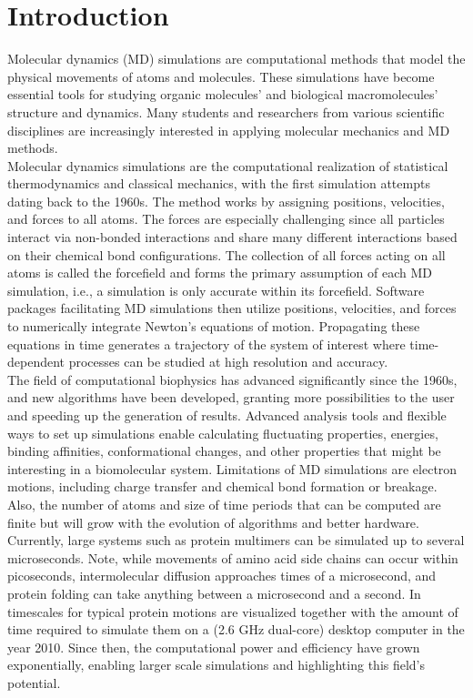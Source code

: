 \documentclass[9pt,tutorial]{livecoms}
\begin{document}
\section{Introduction}
Molecular dynamics (MD) simulations are computational methods that model the physical movements of atoms and molecules. These simulations have become essential tools for studying organic molecules' and biological macromolecules' structure and dynamics. Many students and researchers from various scientific disciplines are increasingly interested in applying molecular mechanics and MD methods.\\ 
Molecular dynamics simulations are the computational realization of statistical thermodynamics and classical mechanics, with the first simulation attempts dating back to the 1960s.\cite{Rahman1964} The method works by assigning positions, velocities, and forces to all atoms. The forces are especially challenging since all particles interact via non-bonded interactions and share many different interactions based on their chemical bond configurations. The collection of all forces acting on all atoms is called the forcefield and forms the primary assumption of each MD simulation, i.e., a simulation is only accurate within its forcefield. Software packages facilitating MD simulations then utilize positions, velocities, and forces to numerically integrate Newton's equations of motion. Propagating these equations in time generates a trajectory of the system of interest where time-dependent processes can be studied at high resolution and accuracy.\cite{Allen1990}\\
The field of computational biophysics has advanced significantly since the 1960s, and new algorithms have been developed, granting more possibilities to the user and speeding up the generation of results. Advanced analysis tools and flexible ways to set up simulations enable calculating fluctuating properties, energies, binding affinities, conformational changes, and other properties that might be interesting in a biomolecular system. Limitations of MD simulations are electron motions, including charge transfer and chemical bond formation or breakage. Also, the number of atoms and size of time periods that can be computed are finite but will grow with the evolution of algorithms and better hardware. Currently, large systems such as protein multimers can be simulated up to several microseconds.\cite{Shaw2014} Note, while movements of amino acid side chains can occur within picoseconds, intermolecular diffusion approaches times of a microsecond, and protein folding can take anything between a microsecond and a second.\cite{Zwier2010} In  timescales for typical protein motions are visualized together with the amount of time required to simulate them on a (2.6 GHz dual-core) desktop computer in the year 2010. Since then, the computational power and efficiency have grown exponentially, enabling larger scale simulations and highlighting this field's potential.
\end{document}
